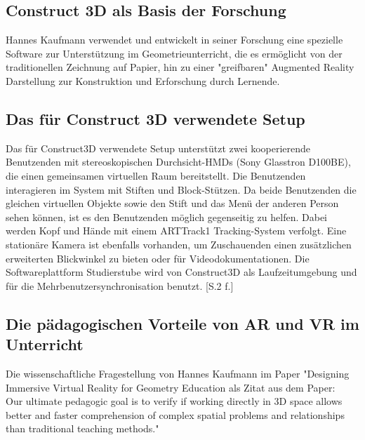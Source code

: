 \documentclass[deutsch]{llncs}
\begin{document}
\subsection{Construct 3D als Basis der Forschung}
\label{subsec:}
Hannes Kaufmann verwendet und entwickelt in seiner Forschung eine spezielle Software zur Unterstützung im Geometrieunterricht, die es ermöglicht von der traditionellen Zeichnung auf Papier,
hin zu einer "greifbaren" Augmented Reality Darstellung zur Konstruktion und Erforschung durch Lernende. \\

\subsection{Das für Construct 3D verwendete Setup}
\label{subsec:}
Das für Construct3D verwendete Setup unterstützt zwei kooperierende Benutzenden mit stereoskopischen Durchsicht-HMDs 
(Sony Glasstron D100BE), die einen gemeinsamen virtuellen Raum bereitstellt. Die Benutzenden interagieren im System mit Stiften und Block-Stützen. 
Da beide Benutzenden die gleichen virtuellen Objekte sowie den Stift und das Menü der anderen Person sehen können, ist es den Benutzenden möglich 
gegenseitig zu helfen. Dabei werden Kopf und Hände mit einem ARTTrack1 Tracking-System verfolgt. Eine stationäre Kamera ist ebenfalls vorhanden, um Zuschauenden
einen zusätzlichen erweiterten Blickwinkel zu bieten oder für Videodokumentationen. Die Softwareplattform Studierstube wird von Construct3D als 
Laufzeitumgebung und für die Mehrbenutzersynchronisation benutzt. [S.2 f.]\\

\subsection{Die pädagogischen Vorteile von AR und VR im Unterricht}
\label{subsec:}
Die wissenschaftliche Fragestellung von Hannes Kaufmann im Paper "Designing Immersive Virtual Reality for Geometry Education als Zitat aus dem Paper: \\
Our ultimate pedagogic goal is to verify if working directly in 3D space allows better and faster comprehension of complex spatial problems and relationships than traditional teaching methods." \cite{3} %
\end{document}
